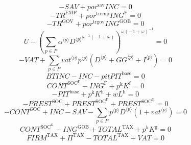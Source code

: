 \begin{equation}
-{S\!A\!V} + {{p\!o\!r}^{\mathrm{sav}}} {{I\!N\!C}} = 0
\end{equation}
\begin{equation}
-{T\!R}^{\mathrm{EMP}} + {{p\!o\!r}^{\mathrm{tremp}}} {{I\!N\!G}^{\mathrm{F}}} = 0
\end{equation}
\begin{equation}
-{T\!R}^{\mathrm{GOV}} + {{p\!o\!r}^{\mathrm{trgov}}} {{I\!N\!G}^{\mathrm{GOB}}} = 0
\end{equation}
\begin{equation}
U - \left(\sum_{p\in P} {{\alpha}^{\langle p\rangle}} {{{D}^{\langle p\rangle}}^{{\omega}^{-1} \left(-1 + \omega\right)}}\right)^{{\omega} \left(-1 + \omega\right)^{-1}} = 0
\end{equation}
\begin{equation}
-{V\!A\!T} + \sum_{p\in P} {{{v\!a\!t}}^{\langle p\rangle}} {{p}^{\langle p\rangle}} \left({D}^{\langle p\rangle} + {{G\!G}}^{\langle p\rangle} + {I}^{\langle p\rangle}\right) = 0
\end{equation}
\begin{equation}
{B\!T\!I\!N\!C} - {I\!N\!C} - {{p\!i\!t}} {{P\!I\!T}^{\mathrm{base}}} = 0
\end{equation}
\begin{equation}
{C\!O\!N\!T}^{\mathrm{SOC}^{\mathrm{F}}} - {I\!N\!G}^{\mathrm{F}} + {p^{\mathrm{k}}} {K^{\mathrm{f}}} = 0
\end{equation}
\begin{equation}
-{P\!I\!T}^{\mathrm{base}} + {p^{\mathrm{k}}} {K^{\mathrm{h}}} + {w} {L^{\mathrm{h}}} = 0
\end{equation}
\begin{equation}
-{P\!R\!E\!S\!T}^{\mathrm{SOC}} + {P\!R\!E\!S\!T}^{\mathrm{SOC}^{\mathrm{F}}} + {P\!R\!E\!S\!T}^{\mathrm{SOC}^{\mathrm{G}}} = 0
\end{equation}
\begin{equation}
-{C\!O\!N\!T}^{\mathrm{SOC}} + {I\!N\!C} - {S\!A\!V} - \sum_{p\in P} {{p}^{\langle p\rangle}} {{D}^{\langle p\rangle}} \left(1 + {{v\!a\!t}}^{\langle p\rangle}\right) = 0
\end{equation}
\begin{equation}
{C\!O\!N\!T}^{\mathrm{SOC}^{\mathrm{G}}} - {I\!N\!G}^{\mathrm{GOB}} + {T\!O\!T\!A\!L}^{\mathrm{TAX}} + {p^{\mathrm{k}}} {K^{\mathrm{g}}} = 0
\end{equation}
\begin{equation}
{F\!I\!R\!M}^{\mathrm{TAX}} + \Pi^{\mathrm{TAX}} - {T\!O\!T\!A\!L}^{\mathrm{TAX}} + {V\!A\!T} = 0
\end{equation}
